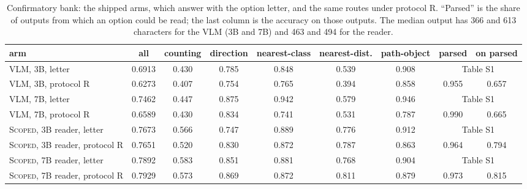 \documentclass[10pt]{article}
\renewcommand{\thetable}{S\arabic{table}}
\newcommand{\settab}[1]{\setcounter{table}{#1}\addtocounter{table}{-1}\renewcommand{\thetable}{S\arabic{table}}}
\begin{document}
\settab{13}\begin{table}[h]\centering\footnotesize
\caption{Confirmatory bank: the shipped arms, which answer with the option letter, and the same routes under protocol R. ``Parsed'' is the share of outputs from which an option could be read; the last column is the accuracy on those outputs. The median output has 366 and 613 characters for the VLM (3B and 7B) and 463 and 494 for the reader.}\label{tab:s13}
\setlength{\tabcolsep}{3.5pt}\begin{tabular}{@{}lcccccccc@{}}
\toprule arm & all & counting & direction & nearest-class & nearest-dist. & path-object & parsed & on parsed \\ \midrule
VLM, 3B, letter & 0.6913 & 0.430 & 0.785 & 0.848 & 0.539 & 0.908 & \multicolumn{2}{c}{Table S1} \\
VLM, 3B, protocol R & 0.6273 & 0.407 & 0.754 & 0.765 & 0.394 & 0.858 & 0.955 & 0.657 \\
VLM, 7B, letter & 0.7462 & 0.447 & 0.875 & 0.942 & 0.579 & 0.946 & \multicolumn{2}{c}{Table S1} \\
VLM, 7B, protocol R & 0.6589 & 0.430 & 0.834 & 0.741 & 0.531 & 0.787 & 0.990 & 0.665 \\ \midrule
\textsc{Scoped}, 3B reader, letter & 0.7673 & 0.566 & 0.747 & 0.889 & 0.776 & 0.912 & \multicolumn{2}{c}{Table S1} \\
\textsc{Scoped}, 3B reader, protocol R & 0.7651 & 0.520 & 0.830 & 0.872 & 0.787 & 0.863 & 0.964 & 0.794 \\
\textsc{Scoped}, 7B reader, letter & 0.7892 & 0.583 & 0.851 & 0.881 & 0.768 & 0.904 & \multicolumn{2}{c}{Table S1} \\
\textsc{Scoped}, 7B reader, protocol R & 0.7929 & 0.573 & 0.869 & 0.872 & 0.811 & 0.879 & 0.973 & 0.815 \\
\bottomrule
\end{tabular}
\end{table}
\end{document}
